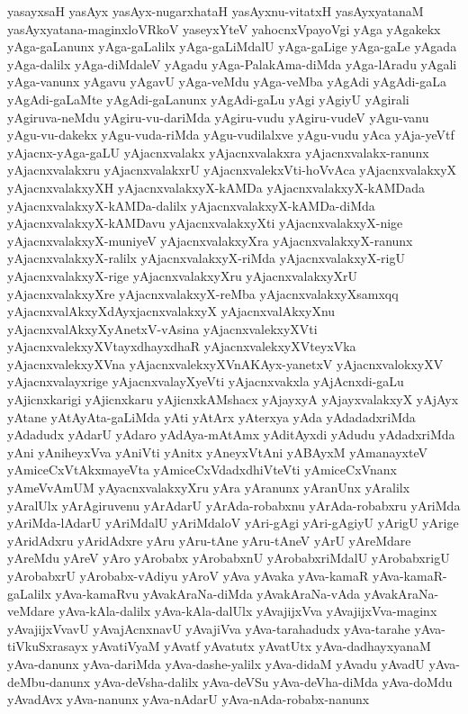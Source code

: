 {yasayxsaH
yasAyx
yasAyx-nugarxhataH
yasAyxnu-vitatxH
yasAyxyatanaM
yasAyxyatana-maginxloVRkoV
yaseyxYteV
yahocnxVpayoVgi
yAga
yAgakekx
yAga-gaLanunx
yAga-gaLalilx
yAga-gaLiMdalU
yAga-gaLige
yAga-gaLe
yAgada
yAga-dalilx
yAga-diMdaleV
yAgadu
yAga-PalakAma-diMda
yAga-lAradu
yAgali
yAga-vanunx
yAgavu
yAgavU
yAga-veMdu
yAga-veMba
yAgAdi
yAgAdi-gaLa
yAgAdi-gaLaMte
yAgAdi-gaLanunx
yAgAdi-gaLu
yAgi
yAgiyU
yAgirali
yAgiruva-neMdu
yAgiru-vu-dariMda
yAgiru-vudu
yAgiru-vudeV
yAgu-vanu
yAgu-vu-dakekx
yAgu-vuda-riMda
yAgu-vudilalxve
yAgu-vudu
yAca
yAja-yeVtf
yAjacnx-yAga-gaLU
yAjacnxvalakx
yAjacnxvalakxra
yAjacnxvalakx-ranunx
yAjacnxvalakxru
yAjacnxvalakxrU
yAjacnxvalekxVti-hoVvAca
yAjacnxvalakxyX
yAjacnxvalakxyXH
yAjacnxvalakxyX-kAMDa
yAjacnxvalakxyX-kAMDada
yAjacnxvalakxyX-kAMDa-dalilx
yAjacnxvalakxyX-kAMDa-diMda
yAjacnxvalakxyX-kAMDavu
yAjacnxvalakxyXti
yAjacnxvalakxyX-nige
yAjacnxvalakxyX-muniyeV
yAjacnxvalakxyXra
yAjacnxvalakxyX-ranunx
yAjacnxvalakxyX-ralilx
yAjacnxvalakxyX-riMda
yAjacnxvalakxyX-rigU
yAjacnxvalakxyX-rige
yAjacnxvalakxyXru
yAjacnxvalakxyXrU
yAjacnxvalakxyXre
yAjacnxvalakxyX-reMba
yAjacnxvalakxyXsamxqq
yAjacnxvalAkxyXdAyxjacnxvalakxyX
yAjacnxvalAkxyXnu
yAjacnxvalAkxyXyAnetxV-vAsina
yAjacnxvalekxyXVti
yAjacnxvalekxyXVtayxdhayxdhaR
yAjacnxvalekxyXVteyxVka
yAjacnxvalekxyXVna
yAjacnxvalekxyXVnAKAyx-yanetxV
yAjacnxvalokxyXV
yAjacnxvalayxrige
yAjacnxvalayXyeVti
yAjacnxvakxla
yAjAcnxdi-gaLu
yAjicnxkarigi
yAjicnxkaru
yAjicnxkAMshacx
yAjayxyA
yAjayxvalakxyX
yAjAyx
yAtane
yAtAyAta-gaLiMda
yAti
yAtArx
yAterxya
yAda
yAdadadxriMda
yAdadudx
yAdarU
yAdaro
yAdAya-mAtAmx
yAditAyxdi
yAdudu
yAdadxriMda
yAni
yAniheyxVva
yAniVti
yAnitx
yAneyxVtAni
yABAyxM
yAmanayxteV
yAmiceCxVtAkxmayeVta
yAmiceCxVdadxdhiVteVti
yAmiceCxVnanx
yAmeVvAmUM
yAyacnxvalakxyXru
yAra
yAranunx
yAranUnx
yAralilx
yAralUlx
yArAgiruvenu
yArAdarU
yArAda-robabxnu
yArAda-robabxru
yAriMda
yAriMda-lAdarU
yAriMdalU
yAriMdaloV
yAri-gAgi
yAri-gAgiyU
yArigU
yArige
yAridAdxru
yAridAdxre
yAru
yAru-tAne
yAru-tAneV
yArU
yAreMdare
yAreMdu
yAreV
yAro
yArobabx
yArobabxnU
yArobabxriMdalU
yArobabxrigU
yArobabxrU
yArobabx-vAdiyu
yAroV
yAva
yAvaka
yAva-kamaR
yAva-kamaR-gaLalilx
yAva-kamaRvu
yAvakAraNa-diMda
yAvakAraNa-vAda
yAvakAraNa-veMdare
yAva-kAla-dalilx
yAva-kAla-dalUlx
yAvajijxVva
yAvajijxVva-maginx
yAvajijxVvavU
yAvajAcnxnavU
yAvajiVva
yAva-tarahadudx
yAva-tarahe
yAva-tiVkuSxrasayx
yAvatiVyaM
yAvatf
yAvatutx
yAvatUtx
yAva-dadhayxyanaM
yAva-danunx
yAva-dariMda
yAva-dashe-yalilx
yAva-didaM
yAvadu
yAvadU
yAva-deMbu-danunx
yAva-deVsha-dalilx
yAva-deVSu
yAva-deVha-diMda
yAva-doMdu
yAvadAvx
yAva-nanunx
yAva-nAdarU
yAva-nAda-robabx-nanunx
}
